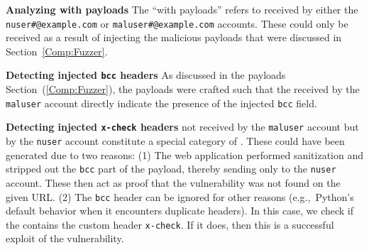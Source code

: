 \noindent\textbf{Analyzing \email with payloads}
The ``\emails with payloads'' refers to \emails received by either the {\lstinline{nuser#@example.com}} or {\lstinline{maluser#@example.com}} accounts. These \emails could only be received as a result of injecting the malicious payloads that were discussed in Section~\ref{Comp:Fuzzer}. 

\noindent\textbf{Detecting injected \texttt{bcc} headers}
As discussed in the payloads Section~(\ref{Comp:Fuzzer}), the payloads were crafted such that the \emails received by the \texttt{maluser} account directly indicate the presence of the injected \texttt{bcc} field. 

\label{analyze:detect_x_check}
\noindent\textbf{Detecting injected \texttt{x-check} headers} \Emails
not received by the \texttt{maluser} account but by the \texttt{nuser}
account constitute a special category of \emails. These \emails could
have been generated due to two reasons: (1) The web application
performed sanitization and stripped out the \texttt{bcc}
part of the payload, thereby sending \emails only to the
\texttt{nuser} account. These \emails then act as proof that the
vulnerability was not found on the given URL. (2) The \texttt{bcc}
header can be ignored for other reasons (e.g.,\ Python's default
behavior when it encounters duplicate headers). In this case, we check
if the \email contains the custom header \texttt{x-check}. If it does,
then this is a successful exploit of the vulnerability.
